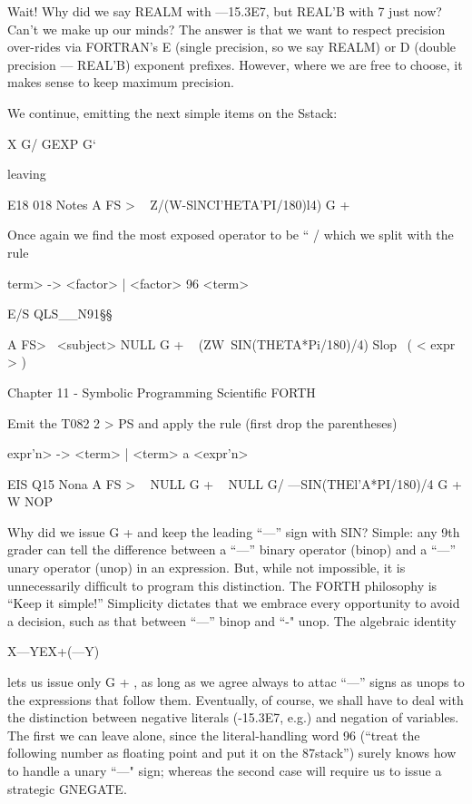 Wait! Why did we say REALM with —15.3E7, but REAL'B with
7 just now? Can’t we make up our minds? The answer is that we
want to respect precision over-rides via FORTRAN's E (single
precision, so we say REALM) or D (double precision — REAL'B)
exponent preﬁxes. However, where we are free to choose, it
makes sense to keep maximum precision.

We continue, emitting the next simple items on the Sstack:

X G/ GEXP G‘

 

leaving

E18 018 Notes
A FS > \ < subject >
Z/(W-SlNCI’HETA'PI/180)l4) G + \ < term >

Once again we ﬁnd the most exposed operator to be “ / which
we split with the rule

\<term> -> <factor> | <factor> 96 <term>

 

E/S QLS__N91§§

A FS> \ <subject>
NULL G + \ < term >
(ZW~SIN(THETA*Pi/180)/4) Slop \ ( < expr > )

Chapter 11 - Symbolic Programming Scientiﬁc FORTH

Emit the T082
2 > PS
and apply the rule (ﬁrst drop the parentheses)

\<expr'n> -> <term> | <term> a <expr'n>

 

EIS Q15 Nona
A FS > \ < subject >
NULL G + \ < term >
NULL G/
—SIN(THEl'A*PI/180)/4 G +
W NOP

Why did we issue G + and keep the leading “—” sign with SIN?
Simple: any 9th grader can tell the difference between a “—”
binary operator (binop) and a “—” unary operator (unop) in an
expression. But, while not impossible, it is unnecessarily difﬁcult
to program this distinction. The FORTH philosophy is “Keep it
simple!” Simplicity dictates that we embrace every opportunity
to avoid a decision, such as that between “—” binop and “-" unop.
The algebraic identity

X—YEX+(—Y)

lets us issue only G + , as long as we agree always to attac “—”
signs as unops to the expressions that follow them. Eventually,
of course, we shall have to deal with the distinction between
negative literals (-15.3E7, e.g.) and negation of variables. The
first we can leave alone, since the literal-handling word 96 (“treat
the following number as ﬂoating point and put it on the 87stack”)
surely knows how to handle a unary “—" sign; whereas the second
case will require us to issue a strategic GNEGATE.

